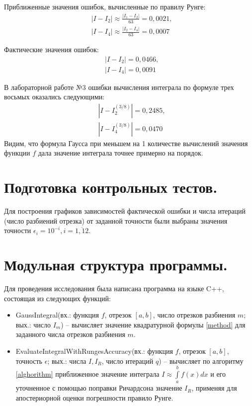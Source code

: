 \documentclass[a4paper, 12pt]{article}
\begin{document}
	Приближенные значения ошибок, вычисленные по правилу Рунге:
	\begin{equation*}
		\begin{aligned}
			&|I-I_2|\approx\frac{|I_1-I_2|}{63}=0,0021,\\
			&|I-I_4|\approx\frac{|I_2-I_4|}{63}=0,0007
		\end{aligned}
	\end{equation*}

	Фактические значения ошибок:
	\begin{equation*}
		\begin{aligned}
			&|I-I_2|=0,0466,\\
			&|I-I_4|=0,0091
		\end{aligned}
	\end{equation*}

	В лабораторной работе №3 ошибки вычисления интеграла по формуле трех восьмых оказались следующими:
	\begin{equation*}
		\begin{aligned}
			&|I-I_2^{(3/8)}|=0,2485,\\
			&|I-I_4^{(3/8)}|=0,0470
		\end{aligned}
	\end{equation*}
	Видим, что формула Гаусса при меньшем на 1 количестве вычислений значения функции $f$ дала значение интеграла точнее примерно на порядок.
	
	\section{Подготовка контрольных тестов.}
	
	Для построения графиков зависимостей фактической ошибки и числа итераций (число разбиений отрезка) от заданной точности были выбраны значения точности $\epsilon_i=10^{-i}, i=\overline{1,12}$. 
	
	\section{Модульная структура программы.}
	Для проведения исследования была написана программа на языке C++, состоящая из следующих функций:
	\begin{itemize}
		\item GaussIntegral(вх.: функция $f$, отрезок $[a,b]$, число отрезков разбиения $m$; вых.: число $I_m$) -- вычисляет значение квадратурной формулы \eqref{method} для заданного числа отрезков разбиения $m$.
		\item EvaluateIntegralWithRungesAccuracy(вх.: функция $f$, отрезок $[a,b]$, точность $\epsilon$; вых.: числа $I, I_R$, число итераций $q$) -- вычисляет по алгоритму \ref{alghorithm} приближенное значение интеграла $I\approx\int\limits_a^bf(x)dx$ и его уточненное с помощью поправки Ричардсона значение $I_R$, применяя для апостериорной оценки погрешности правило Рунге.
	\end{itemize}
	
\end{document}
